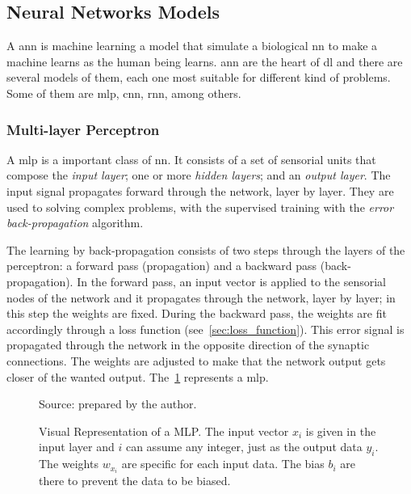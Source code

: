 \subsection{Neural Networks Models}\label{sec:nn_models}

A \gls*{ann} is machine learning a model that simulate a biological \gls*{nn} to make a machine learns as the human being learns.
\gls*{ann} are the heart of \gls*{dl} and there are several models of them, each one most suitable for different kind of problems.
Some of them are \gls*{mlp}, \gls*{cnn}, \gls*{rnn}, among others.

\subsubsection*{Multi-layer Perceptron}

A \gls*{mlp} is a important class of \gls*{nn}. It consists of a set of sensorial units that compose the \emph{input layer}; one or more \emph{hidden layers}; and an \emph{output layer}. The input signal propagates forward through the network, layer by layer. They are used to solving complex problems, with the supervised training with the \emph{error back-propagation} algorithm.

The learning by back-propagation consists of two steps through the layers of the perceptron: a forward pass (propagation) and a backward pass (back-propagation). In the forward pass, an input vector is applied to the sensorial nodes of the network and it propagates through the network, layer by layer; in this step the weights are fixed. During the backward pass, the weights are fit accordingly through a loss function (see~\cref{sec:loss_function}). This error signal is propagated through the network in the opposite direction of the synaptic connections. The weights are adjusted to make that the network output gets closer of the wanted output. The~\cref{fig:mlp} represents a \gls*{mlp}.

\begin{figure}[!htb]\footnotesize
    \centering
    \caption[Visual Representation of a MLP]{Visual Representation of a MLP. The input vector \(x_i\) is given in the input layer and \(i\) can assume any integer, just as the output data \(y_i\). The weights \(w_{x_i}\) are specific for each input data. The bias \(b_i\) are there to prevent the data to be biased.}
    
    \begin{flushleft}\footnotesize
        Source: prepared by the author.
    \end{flushleft}
    \label{fig:mlp}
\end{figure}


